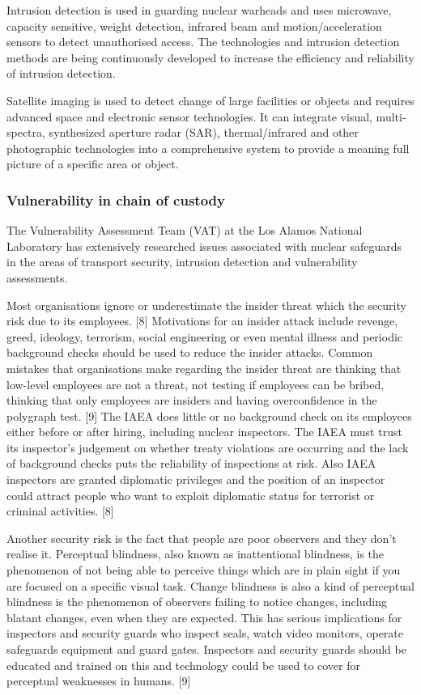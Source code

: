 \documentclass[twocolumn,a4paper]{article}
\begin{document}
Intrusion detection is used in guarding nuclear warheads and uses microwave, capacity sensitive,
weight detection, infrared beam and motion/acceleration sensors to detect unauthorised access.
The technologies and intrusion detection methods are being continuously developed to increase the
efficiency and reliability of intrusion detection. \citep{wuwen2004}

Satellite imaging is used to detect change of large facilities or objects and requires advanced space
and electronic sensor technologies. It can integrate visual, multi-spectra, synthesized aperture radar
(SAR), thermal/infrared and other photographic technologies into a comprehensive system to
provide a meaning full picture of a specific area or object. \citep{wuwen2004}

\subsubsection{Vulnerability in chain of custody}
The Vulnerability Assessment Team (VAT) at the Los Alamos National Laboratory has extensively
researched issues associated with nuclear safeguards in the areas of transport security, intrusion
detection and vulnerability assessments.

Most organisations ignore or underestimate the insider threat which the security risk due to its 
employees. [8] Motivations for an insider attack include revenge, greed, ideology, terrorism, 
social engineering or even mental illness and periodic background checks should be used to reduce 
the insider attacks. Common mistakes that organisations make regarding the insider threat are thinking 
that low-level employees are not a threat, not testing if employees can be bribed, thinking that only 
employees are insiders and having overconfidence in the polygraph test. [9] The IAEA does little or no 
background check on its employees either before or after hiring, including nuclear inspectors. The 
IAEA must trust its inspector’s judgement on whether treaty violations are occurring and the lack of 
background checks puts the reliability of inspections at risk. Also IAEA inspectors are granted 
diplomatic privileges and the position of an inspector could attract people who want to exploit 
diplomatic status for terrorist or criminal activities. [8]

Another security risk is the fact that people are poor observers and they don't realise it. Perceptual 
blindness, also known as inattentional blindness, is the phenomenon of not being able to perceive things 
which are in plain sight if you are focused on a specific visual task. Change blindness is also a kind of 
perceptual blindness is the phenomenon of observers failing to notice changes, including blatant changes, 
even when they are expected. This has serious implications for inspectors and security guards who inspect 
seals, watch video monitors, operate safeguards equipment and guard gates. Inspectors and security guards 
should be educated and trained on this and technology could be used to cover for perceptual weaknesses in 
humans. [9]
\end{document}
